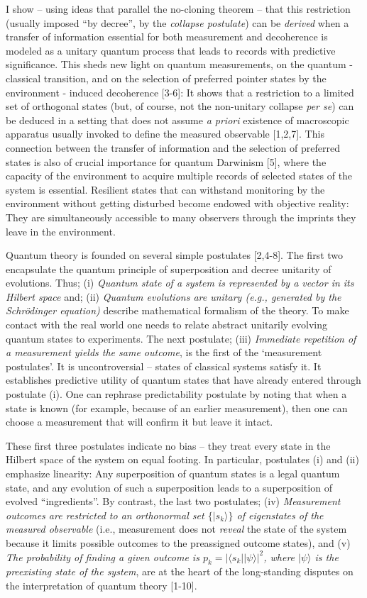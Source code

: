 \documentclass[aps,twocolumn,pra,onecolumn,12pt]{revtex4}
\newcommand{\bra}[1]    {\langle #1|}
\newcommand{\ket}[1]    {| #1 \rangle}
\newcommand{\+}         {\dagger}
\begin{document}
I show -- using ideas that parallel the no-cloning theorem -- that this restriction (usually imposed ``by decree'', by the {\em collapse postulate}) can be {\em derived} when a transfer of information essential for both measurement and decoherence is modeled as a unitary quantum process that leads to records with predictive significance. This sheds new light on quantum measurements, on the quantum - classical transition, and on the selection of preferred pointer states by the environment - induced decoherence [3-6]: It shows that a restriction to a limited set of orthogonal states (but, of course, not the non-unitary collapse {\em per se}) can be deduced in a setting that does not assume {\em a priori} existence of macroscopic apparatus usually invoked to define the measured observable [1,2,7]. This connection between the transfer of information and the selection of preferred states is also of crucial importance for quantum Darwinism [5], where the capacity of the environment to acquire multiple records of selected states of the system is essential. Resilient states that can withstand monitoring by the environment without getting disturbed become endowed with objective reality: They are simultaneously accessible to many observers through the imprints they leave in the environment.

Quantum theory is founded on several simple postulates [2,4-8]. The first two encapsulate the quantum principle of superposition and decree unitarity of evolutions. Thus; (i) {\it Quantum state of a system is represented by a vector in its Hilbert space} and; (ii) {\it Quantum evolutions are unitary (e.g., generated by the Schr\"odinger equation)} describe mathematical formalism of the theory. To make contact with the real world one needs to relate abstract unitarily evolving quantum states to experiments. The next postulate; (iii) {\it Immediate repetition of a measurement yields the same outcome}, is the first 
of the `measurement postulates'. It is uncontroversial -- states of classical systems satisfy it. It establishes predictive utility of quantum states that have already entered through postulate (i). One can rephrase predictability postulate by noting that when a state is known (for example, because of an earlier
measurement), then one can choose a measurement that will confirm it but leave it intact. 

These first three postulates indicate no bias -- they treat every state in the Hilbert space of the system 
on equal footing. In particular, postulates (i) and (ii) emphasize linearity: Any superposition of quantum states is a legal quantum state, and any evolution of such a superposition leads to a superposition 
of evolved ``ingredients''. By contrast, the last two postulates; (iv) {\it Measurement outcomes are restricted to an orthonormal set $\{\ket {s_k}\}$ of eigenstates of the measured observable} (i.e., measurement does not {\it reveal} the state of the system because it limits possible outcomes to the
preassigned outcome states), and (v) {\it The probability of finding a given outcome is $p_k=|\bra {s_k} \ket \psi|^2$, where $\ket \psi$ is the preexisting state of the system}, are at the heart of the long-standing disputes on the interpretation of quantum theory [1-10]. 
\end{document}
